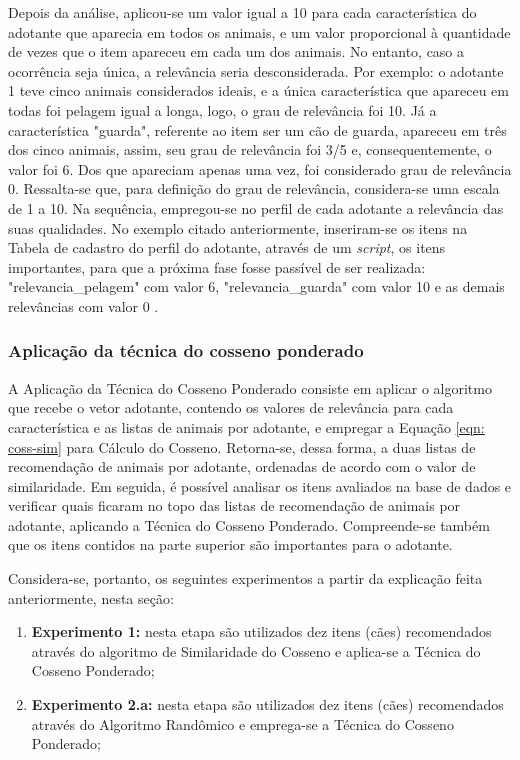 \documentclass[portuguese]{textolivre}
\begin{document}
Depois da análise, aplicou-se um valor igual a 10 para cada característica do adotante que aparecia em todos os animais, e um valor proporcional à quantidade de vezes que o item apareceu em cada um dos animais. No entanto, caso a ocorrência seja única, a relevância seria desconsiderada. Por exemplo: o adotante 1 teve cinco animais considerados ideais, e a única característica que apareceu em todas foi pelagem igual a longa, logo, o grau de relevância foi 10. Já a característica "guarda", referente ao item ser um cão de guarda, apareceu em três dos cinco animais, assim, seu grau de relevância foi 3/5 e, consequentemente, o valor foi 6. Dos que apareciam apenas uma vez, foi considerado grau de relevância 0. Ressalta-se que, para definição do grau de relevância, considera-se uma escala de 1 a 10. Na sequência, empregou-se no perfil de cada adotante a relevância das suas qualidades. No exemplo citado anteriormente, inseriram-se os itens na Tabela de cadastro do perfil do adotante, através de um \textit{script}, os itens importantes, para que a próxima fase fosse passível de ser realizada: "relevancia\_pelagem" com valor 6, "relevancia\_guarda" com valor 10 e as demais relevâncias com valor 0 .

\subsubsection{Aplicação da técnica do cosseno ponderado}

A Aplicação da Técnica do Cosseno Ponderado consiste em aplicar o algoritmo que recebe o vetor adotante, contendo os valores de relevância para cada característica e as listas de animais por adotante, e empregar a Equação \eqref{eqn: coss-sim} para Cálculo do Cosseno. Retorna-se, dessa forma, a duas listas de recomendação de animais por adotante, ordenadas de acordo com o valor de similaridade. Em seguida, é possível analisar os itens avaliados na base de dados e verificar quais ficaram no topo das listas de recomendação de animais por adotante, aplicando a Técnica do Cosseno Ponderado. Compreende-se também que os itens contidos na parte superior são importantes para o adotante. 

Considera-se, portanto, os seguintes experimentos a partir da explicação feita anteriormente, nesta seção:

\begin{enumerate}
    \item \textbf{Experimento 1:} nesta etapa são utilizados dez itens (cães) recomendados através do algoritmo de Similaridade do Cosseno e aplica-se a Técnica do Cosseno Ponderado;
     \item \textbf{Experimento 2.a:} nesta etapa são utilizados dez itens (cães) recomendados através do Algoritmo Randômico e emprega-se a Técnica do Cosseno Ponderado;
\end{enumerate}
\end{document}

